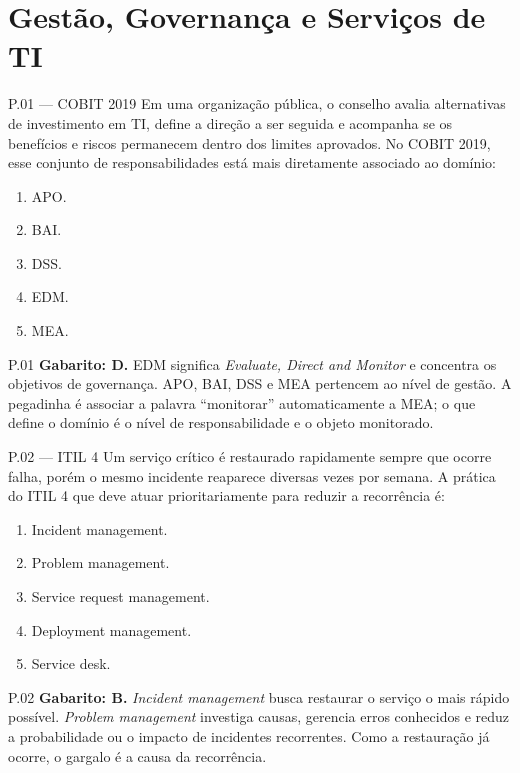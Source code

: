 
\section{Gestão, Governança e Serviços de TI}

\begin{questao}{ P.01 — COBIT 2019}
Em uma organização pública, o conselho avalia alternativas de investimento em TI, define a direção a ser seguida e acompanha se os benefícios e riscos permanecem dentro dos limites aprovados. No COBIT 2019, esse conjunto de responsabilidades está mais diretamente associado ao domínio:
\begin{enumerate}[label=\Alph*)]
\item APO.
\item BAI.
\item DSS.
\item EDM.
\item MEA.
\end{enumerate}
\end{questao}
\begin{solucao}{P.01}
\textbf{Gabarito: D.} EDM significa \textit{Evaluate, Direct and Monitor} e concentra os objetivos de governança. APO, BAI, DSS e MEA pertencem ao nível de gestão. A pegadinha é associar a palavra ``monitorar'' automaticamente a MEA; o que define o domínio é o nível de responsabilidade e o objeto monitorado.
\end{solucao}

\begin{questao}{ P.02 — ITIL 4}
Um serviço crítico é restaurado rapidamente sempre que ocorre falha, porém o mesmo incidente reaparece diversas vezes por semana. A prática do ITIL 4 que deve atuar prioritariamente para reduzir a recorrência é:
\begin{enumerate}[label=\Alph*)]
\item Incident management.
\item Problem management.
\item Service request management.
\item Deployment management.
\item Service desk.
\end{enumerate}
\end{questao}
\begin{solucao}{P.02}
\textbf{Gabarito: B.} \textit{Incident management} busca restaurar o serviço o mais rápido possível. \textit{Problem management} investiga causas, gerencia erros conhecidos e reduz a probabilidade ou o impacto de incidentes recorrentes. Como a restauração já ocorre, o gargalo é a causa da recorrência.
\end{solucao}

